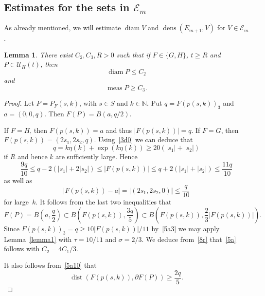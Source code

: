\documentclass[12pt,a4paper]{amsart}
\theoremstyle{plain}
\newtheorem{lemma}[theorem]{Lemma}
\theoremstyle{definition}
\theoremstyle{remark}
\newcommand{\diam}{\operatorname{diam}}
\def\N{\mathbb N}
\def\cE{\mathcal E}
\def\cU{\mathcal U}
\def\dens{\operatorname{dens}}
\def\dist{\operatorname{dist}}
\def\meas{\operatorname{meas}}
\numberwithin{equation}{section}
\begin{document}
\subsection{Estimates for the sets in \texorpdfstring{$\cE_m$}{Em}}\label{estimates_Em}
As already mentioned, we will estimate $\diam V$ and $\dens(E_{m+1},V)$
for $V\in\cE_m$.
\begin{lemma} \label{lemma2}
There exist $C_2,C_3,R>0$ such that if $F\in\{G,H\}$, $t\geq R$
 and $P\in\cU_H(t)$, then
\begin{equation}\label{5a}
\diam P\leq C_2
\end{equation}
and
\begin{equation}\label{5a1}
\meas P\geq C_3.
\end{equation}
\end{lemma}
\begin{proof}
Let $P=P_F(s,k)$, with $s\in S$ and $k\in\N$. Put $q=F(p(s,k))_3$ and $a=(0,0,q)$.
Then $F(P)=B(a,q/2)$.

If $F=H$, then $F(p(s,k))=a$ and thus $|F(p(s,k))|=q$.
If $F=G$, then $F(p(s,k))=(2s_1,2s_2,q)$.
Using~\eqref{3d0} we can deduce that
\begin{equation}\label{5a2}
q=k\eta(k)+\exp(k\eta(k))\geq 20(|s_1|+|s_2|)
\end{equation}
if $R$ and hence $k$ are sufficiently large. Hence 
\begin{equation}\label{5a3}
\frac{9q}{10}\leq q-2(|s_1|+2|s_2|)\leq 
|F(p(s,k))|\leq q+2(|s_1|+|s_2|)\leq \frac{11q}{10}
\end{equation}
as well as 
\begin{equation}\label{5a10}
|F(p(s,k))-a|=|(2s_1,2s_2,0)|\leq \frac{q}{10}
\end{equation}
 for large~$k$.
It follows from the last two inequalities that
\begin{equation}\label{5a11}
F(P)=B\!\left(a,\frac{q}{2}\right)\subset B\!\left(F(p(s,k)),\frac{3q}{5}\right)
\subset B\!\left(F(p(s,k)),\frac23|F(p(s,k))|\right).
\end{equation}
Since $F(p(s,k))_3=q\geq 10|F(p(s,k))|/11$ by~\eqref{5a3} we may apply Lemma~\ref{lemma1} 
with $\tau=10/11$ and $\sigma=2/3$. We deduce from~\eqref{8r} that~\eqref{5a} follows
with $C_2=4C_1/3$.

It also follows from~\eqref{5a10} that
\begin{equation}\label{5b}
\dist(F(p(s,k)),\partial F(P))\geq \frac{2q}{5}.
\end{equation}


\end{proof}
\end{document}
